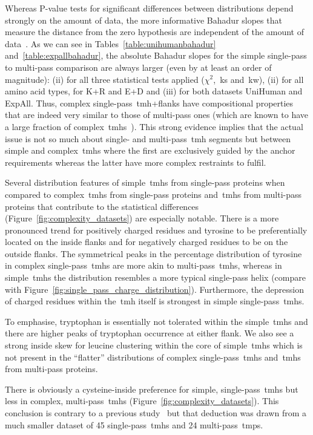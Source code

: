 Whereas P-value tests for significant differences between distributions depend strongly on the amount of data, the more informative Bahadur slopes that measure the distance from the zero hypothesis are independent of the amount of data~\cite{Bahadur1967, Bahadur1971, Sunyaev1998}.
As we can see in Tables~\ref{table:unihumanbahadur} and~\ref{table:expallbahadur}, the absolute Bahadur slopes for the simple single-pass to multi-pass comparison are always larger (even by at least an order of magnitude): (ii) for all three statistical tests applied (\({\chi}^{2}\),~\gls{ks} and~\gls{kw}), (ii) for all amino acid types, for K+R and E+D and (iii) for both datasets UniHuman and ExpAll.
Thus, complex single-pass~\gls{tmh}+flanks have compositional properties that are indeed very similar to those of multi-pass ones (which are known to have a large fraction of complex~\gls{tmh}s~\cite{Wong2011, Wong2012}).
This strong evidence implies that the actual issue is not so much about single- and multi-pass~\gls{tmh} segments but between simple and complex~\gls{tmh}s where the first are exclusively guided by the anchor requirements whereas the latter have more complex restraints to fulfil.

Several distribution features of simple~\gls{tmh}s from single-pass proteins when compared to complex~\gls{tmh}s from single-pass proteins and~\gls{tmh}s from multi-pass proteins that contribute to the statistical differences (Figure~\ref{fig:complexity_datasets}) are especially notable.
There is a more pronounced trend for positively charged residues and tyrosine to be preferentially located on the inside flanks and for negatively charged residues to be on the outside flanks.
The symmetrical peaks in the percentage distribution of tyrosine in complex single-pass~\gls{tmh}s are more akin to multi-pass~\gls{tmh}s, whereas in simple~\gls{tmh}s the distribution resembles a more typical single-pass helix (compare with Figure~\ref{fig:single_pass_charge_distribution}).
Furthermore, the depression of charged residues within the~\gls{tmh} itself is strongest in simple single-pass~\gls{tmh}s.

To emphasise, tryptophan is essentially not tolerated within the simple~\gls{tmh}s and there are higher peaks of tryptophan occurrence at either flank.
We also see a strong inside skew for leucine clustering within the core of simple~\gls{tmh}s which is not present in the ``flatter'' distributions of complex single-pass~\gls{tmh}s and~\gls{tmh}s from multi-pass proteins.

There is obviously a cysteine-inside preference for simple, single-pass~\gls{tmh}s but less in complex, multi-pass~\gls{tmh}s (Figure~\ref{fig:complexity_datasets}).
This conclusion is contrary to a previous study~\cite{Nakashima1992} but that deduction was drawn from a much smaller dataset of 45 single-pass~\gls{tmh}s and 24 multi-pass~\gls{tmp}s.

